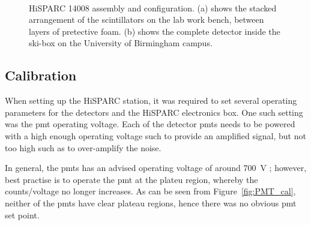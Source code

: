 \begin{figure}[ht]
	\centering
	 \\
	
	\caption{HiSPARC 14008 assembly and configuration. (a) shows the stacked arrangement of the scintillators on the lab work bench, between layers of pretective foam. (b) shows the complete detector inside the ski-box on the University of Birmingham campus.}
	\label{fig:HS_14008_setup}
\end{figure}


\subsection{Calibration}

When setting up the HiSPARC station, it was required to set several operating parameters for the detectors and the HiSPARC electronics box. One such setting was the \gls{pmt} operating voltage. Each of the detector \glspl{pmt} needs to be powered with a high enough operating voltage such to provide an amplified signal, but not too high such as to over-amplify the noise.

In general, the \glspl{pmt} has an advised operating voltage of around 700~V \citep{fokkema_hisparc_2019}; however, best practise is to operate the \gls{pmt} at the plateu region, whereby the counts/voltage no longer increases. As can be seen from Figure~\ref{fig:PMT_cal}, neither of the \glspl{pmt} have clear plateau regions, hence there was no obvious \gls{pmt} set point.

